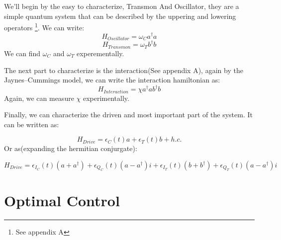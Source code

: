 \documentclass{article}
\numberwithin{equation}{section} %
\begin{document}
We'll begin by the easy to characterize, Transmon And Oscillator, they are a simple quantum system that can be described by the uppering and lowering operators \footnote{See appendix A}. We can write:
\begin{equation}
H_{Oscillator} = \omega_C a^\dag{}a
\end{equation}
\begin{equation}
H_{Transmon} = \omega_T b^\dag{}b
\end{equation}
We can find $\omega_C$ and $\omega_T$ experementally. %
\par
The next part to characterize is the interaction(See appendix A), again by the Jaynes–Cummings model, we can write the interaction hamiltonian as:
\begin{equation}
H_{Interaction} = \chi a^\dag{} a  b^\dag{} b %
\end{equation}
Again, we can measure $\chi$ experimentally.  %
\par
Finally, we can characterize the driven and most important part of the system. It can be written as: %

\begin{equation}
H_{Drive} = \epsilon_C(t)a + \epsilon_T(t)b + h.c.
\end{equation}
Or as(expanding the hermitian conjurgate):

\begin{equation}
H_{Drive} = \epsilon_{I_C}(t)(a + a^\dag{}) + \epsilon_{Q_C}(t)(a - a^\dag{})i + \epsilon_{I_T}(t)(b + b^\dag{})+ \epsilon_{Q_T}(t)(a - a^\dag{})i
\end{equation}

\newpage
\section{Optimal Control}
\end{document}
